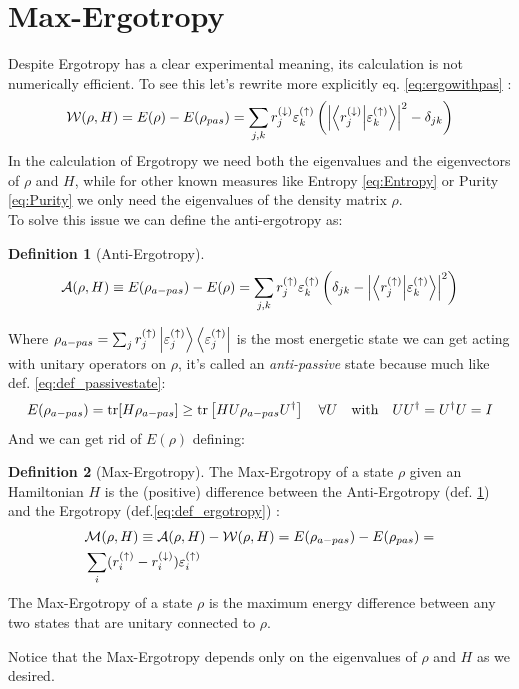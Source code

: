\documentclass[12pt,a4paper]{book}
\theoremstyle{definition}
\newtheorem{definition}{Definition}[section]
\begin{document}
\section{Max-Ergotropy}
Despite Ergotropy has a clear experimental meaning, its calculation is not numerically efficient. To see this
let's rewrite more explicitly eq. \ref{eq:ergowithpas} :
\begin{equation}
	\mathcal{W}(\rho,H)=E(\rho)-E(\rho_{pas})=\sum_{j, k} r_{j}^{(\downarrow)} \varepsilon_{k}^{(\uparrow)}\left( \left|\braket{r_j^{(\downarrow)}}{\varepsilon_{k}^{(\uparrow)}}\right|^2-\delta_{jk}\right)
\end{equation} 
In the calculation of Ergotropy we need both the eigenvalues and the eigenvectors of $\rho$ and $H$, while for other known measures like Entropy \ref{eq:Entropy} or Purity \ref{eq:Purity}  we only need the eigenvalues of the density matrix $\rho$.\\ 
To solve this issue we can define the anti-ergotropy as:
\begin{definition}[Anti-Ergotropy]\label{eq:def_antiergotropy}
	\begin{eqnarray}
		{\cal A}(\rho,H)  \equiv E({\rho}_{a-pas} ) - E({\rho})
		= \sum_{j, k} r_{j}^{(\uparrow)} \varepsilon_{k}^{(\uparrow)}\left( \delta_{jk}-\left|\braket{r_j^{(\uparrow)}}{\varepsilon_{k}^{(\uparrow)}}\right|^2\right)
	\end{eqnarray}
\end{definition}
Where 
$\rho_{a-pas}=\sum_{j} r_{j}^{(\uparrow)}\ket{\varepsilon_{j}^{(\uparrow)}}\bra{\varepsilon_{j}^{(\uparrow)}}$ is the most energetic state we can get acting with unitary operators on $\rho$, it's called an \textit{anti-passive} state because much like def. \eqref{eq:def_passivestate}:
\begin{equation}
	E({\rho}_{a-pas} )=\tr[H \rho_{a-pas}] \ge \tr\left[H U \rho_{a-pas} U^{\dagger}\right] \quad \forall U \quad \text{with} \quad U U^\dagger=U^\dagger U = I
\end{equation}
And we can get rid of $E(\rho)$ defining:
\begin{definition}[Max-Ergotropy]
	The Max-Ergotropy of a state $\rho$ given an Hamiltonian $H$ is the (positive) difference between the  Anti-Ergotropy (def. \ref{eq:def_antiergotropy}) and the Ergotropy (def.\ref{eq:def_ergotropy}) :
	\begin{equation}
		\begin{aligned}
		&{\cal M}(\rho,H)  \equiv {\cal A}(\rho,H) -\mathcal{W}(\rho,H) = E({\rho}_{a-pas} ) - E({\rho}_{pas})	= \\
		&\sum_{i} (r^{(\uparrow)}_i -r^{(\downarrow)}_i) \varepsilon^{(\uparrow)}_i 
		\end{aligned}
	\end{equation}
The Max-Ergotropy of a state $\rho$ is the maximum energy difference between any two states that are unitary connected to $\rho$. 
\end{definition}
Notice that the Max-Ergotropy depends only on the eigenvalues of $\rho$ and $H$ as we desired.
\end{document}
